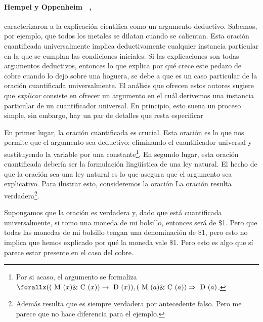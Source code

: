 \paragraph{ Hempel y Oppenheim \parencite{ Hempel1948 }~, }
caracterizaron  a la explicación científica como un
argumento deductivo.  Sabemos, por ejemplo, que \say
{todos los metales se dilatan cuando se calientan.}
Esta oración cuantificada universalmente implica
deductivamente cualquier instancia particular en la
que se cumplan las condiciones iniciales. Si las
explicaciones son todas argumentos deductivos, entonces
lo que explica por qué crece este pedazo de cobre
cuando lo dejo sobre una hoguera, se debe a que es un
caso particular de la oración cuantificada
universalmente. El análisis que ofrecen estos autores
sugiere que \emph{explicar} consiste en ofrecer un
argumento en el cuál derivemos una instancia
particular de un cuantificador universal. En
principio, esto suena un proceso simple, sin embargo,
hay un par de detalles que resta especificar

En primer lugar, la oración cuantificada es crucial.
Esta oración es lo que nos permite que el argumento
sea deductivo: eliminando el cuantificador universal y
sustituyendo la variable por una constante\footnote{
	Por si acaso, el argumento se formaliza
	$ \forallx( ( \text{ M }( x ) \& \text{ C }( x ) )
	\rightarrow \text{ D }( x ) ), ( \text{ M }( a )
	\& \text{ C }( a ) ) \Rightarrow \text{ D }( a ) $.
},
En segundo lugar, esta oración cuantificada debería
ser la formulación lingüística de una ley natural. El
hecho de que la oración sea una ley natural es lo que
asegura que el argumento sea explicativo. Para
ilustrar esto, consideremos la oración  La
oración resulta verdadera\footnote{
    Además resulta que es siempre verdadera por
    antecedente falso. Pero me parece que no hace
    diferencia para el ejemplo.
}.

Supongamos que la oración es verdadera y, dado que
está cuantificada  universalmente, si tomo una moneda
de mi bolsillo, entonces será de $\$$1. Pero que todas
las monedas de mi bolsillo tengan una denominación de
$\$$1, pero esto no implica que hemos explicado por qué
la moneda vale $\$$1. Pero esto es algo que sí parece
estar presente en el caso del cobre.

